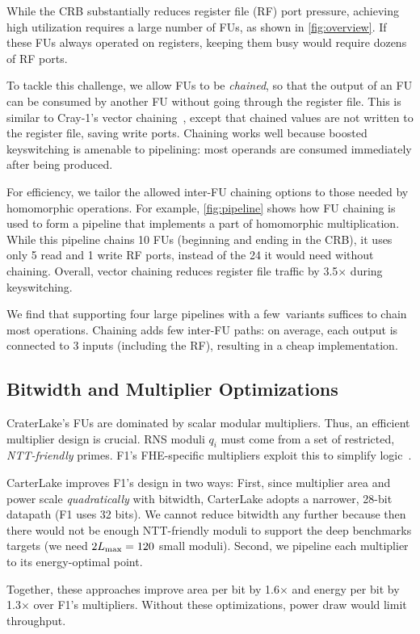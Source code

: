 \figPipeline

While the CRB substantially reduces register file (RF) port pressure, achieving
high utilization requires a large number of FUs, as shown in
\autoref{fig:overview}. If these FUs always operated on registers, keeping them
busy would require dozens of RF ports.

To tackle this challenge, we allow FUs to be \emph{chained}, so that the output
of an FU can be consumed by another FU without going through the register file.
This is similar to Cray-1's vector chaining~\cite{russell:cacm78:cray}, except
that chained values are not written to the register file, saving write ports.
Chaining works well because boosted keyswitching is amenable to pipelining:
most operands are consumed immediately after being produced.

For efficiency, we tailor the allowed inter-FU chaining options to those needed
by homomorphic operations. For example, \autoref{fig:pipeline} shows how FU
chaining is used to form a pipeline that implements a part of homomorphic
multiplication. While this pipeline chains 10 FUs (beginning and ending in the
CRB), it uses only 5 read and 1 write RF ports, instead of the 24 it would need
without chaining. Overall, vector chaining reduces register file traffic by
3.5$\times$ during keyswitching.

We find that supporting four large pipelines with a few~variants suffices to
chain most operations. Chaining adds few inter-FU paths: on average, each
output is connected to 3 inputs (including the RF), resulting in a cheap
implementation.

\subsection{Bitwidth and Multiplier Optimizations}\label{sec:bitwidth}

CraterLake's FUs are dominated by scalar modular multipliers. Thus, an
efficient multiplier design is crucial. RNS moduli $q_i$ must come from a set
of restricted, \emph{NTT-friendly} primes. F1's FHE-specific multipliers
exploit this to simplify logic~\cite{feldmann:micro21:f1}.

CarterLake improves F1's design in two ways: First, since multiplier area and
power scale \emph{quadratically} with bitwidth, CarterLake adopts a narrower,
28-bit datapath (F1 uses 32 bits). We cannot reduce bitwidth any further
because then there would not be enough NTT-friendly moduli to support the deep
benchmarks \name targets (we need $2L_{\textrm{max}} = 120$ small moduli). Second, we
pipeline each multiplier to its energy-optimal point.

Together, these approaches improve area per bit by 1.6$\times$ and energy per
bit by 1.3$\times$ over F1's multipliers. Without these optimizations, power
draw would limit throughput.
